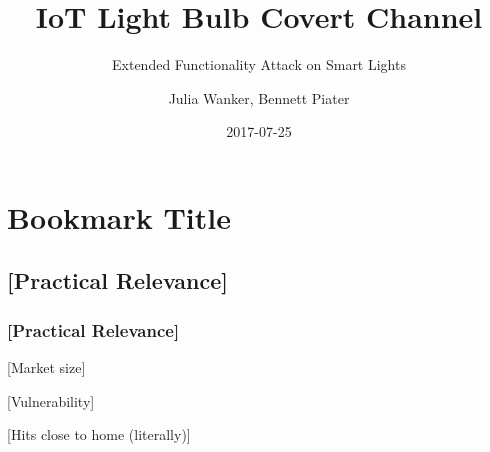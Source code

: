 \documentclass[11pt,t,usepdftitle=false,aspectratio=169]{beamer}
\title[IoT Light Bulb Attack]{IoT Light Bulb Covert Channel}
\subtitle{Extended Functionality Attack on Smart Lights}
\author[Julia Wanker \& Bennett Piater]{Julia Wanker, Bennett Piater}
\date{2017-07-25}
\begin{document}



\section{Bookmark Title}

\subsection{[Practical Relevance]}

\begin{frame}
\frametitle{[Practical Relevance]}
	\begin{block}{[Market size]}

	\end{block}
	\begin{block}{[Vulnerability]}

	\end{block}
	\begin{block}{[Hits close to home (literally)]}

	\end{block}
\end{frame}
\end{document}
